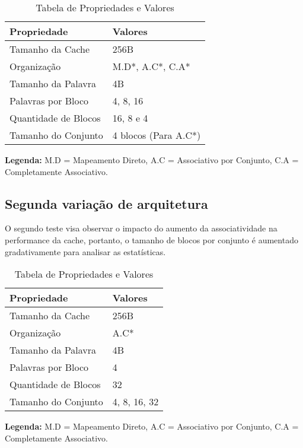\documentclass[conference]{IEEEtran}
\begin{document}
\begin{table}[htb]
\centering
\begin{tabular}{|l|l|}
\hline
\textbf{Propriedade}       & \textbf{Valores}         \\ \hline
Tamanho da Cache           & 256B                    \\ \hline
Organização                & M.D*, A.C*, C.A*        \\ \hline
Tamanho da Palavra         & 4B                  \\ \hline
Palavras por Bloco         & 4, 8, 16                \\ \hline
Quantidade de Blocos       & 16, 8 e 4           \\ \hline
Tamanho do Conjunto        & 4 blocos (Para A.C*)    \\ \hline
\end{tabular}
\caption{Tabela de Propriedades e Valores}
\label{tab:propriedades}
\vspace{0.5cm}
\footnotesize
\textbf{Legenda:} M.D = Mapeamento Direto, A.C = Associativo por Conjunto, C.A = Completamente Associativo.
\end{table}

\subsection{Segunda variação de arquitetura}
O segundo teste visa observar o impacto do aumento da associatividade na performance da cache, portanto, o tamanho de blocos por conjunto é aumentado gradativamente para analisar as estatísticas.
\begin{table}[htb]
\centering
\begin{tabular}{|l|l|}
\hline
\textbf{Propriedade}       & \textbf{Valores}         \\ \hline
Tamanho da Cache           & 256B                    \\ \hline
Organização                & A.C*        \\ \hline
Tamanho da Palavra         & 4B                  \\ \hline
Palavras por Bloco         & 4                \\ \hline
Quantidade de Blocos       & 32          \\ \hline
Tamanho do Conjunto        & 4, 8, 16, 32    \\ \hline
\end{tabular}
\caption{Tabela de Propriedades e Valores}
\label{tab:propriedades}
\vspace{0.5cm}
\footnotesize
\textbf{Legenda:} M.D = Mapeamento Direto, A.C = Associativo por Conjunto, C.A = Completamente Associativo.
\end{table}
\end{document}
